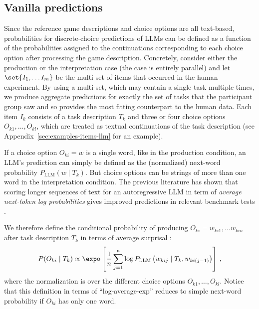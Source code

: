 \documentclass{article}
\begin{document}
\subsection{Vanilla predictions}
\label{sec:vanilla-predictions}

Since the reference game descriptions and choice options are all text-based, probabilities for discrete-choice predictions of LLMs can be defined as a function of the probabilities assigned to the continuations corresponding to each choice option after processing the game description.
Concretely, consider either the production or the interpretation case (the case is entirely parallel) and let \(\set{I_1, \dots I_m}\) be the multi-set of items that occurred in the human experiment.
By using a multi-set, which may contain a single task multiple times, we produce aggregate predictions for exactly the set of tasks that the participant group saw and so provides the most fitting counterpart to the human data.
Each item $I_{k}$ consists of a task description $T_{k}$ and three or four choice options $O_{k1}, \dots, O_{kl}$, which are treated as textual continuations of the task description (see Appendix~\ref{sec:examples-items-llm} for an example).

If a choice option $O_{ki} = w$ is a single word, like in the production condition, an LLM's prediction can simply be defined as the (normalized) next-word probability $P_{\text{LLM}} (w \mid T_{k})$.
But choice options can be strings of more than one word in the interpretation condition.
The previous literature has shown that scoring longer sequences of text for an autoregressive LLM in term of \emph{average next-token log probabilities} gives improved predictions in relevant benchmark tests \citep[e.g.,][]{BrownMann2020:Language-Models}.

We therefore define the conditional probability of producing $O_{ki} = w_{ki1}, \dots w_{kin}$ after task description $T_{k}$ in terms of average surprisal :
%
\begin{align*}
P(O_{ki} \mid T_{k}) \propto \expo \left [  \frac{1}{n} \sum_{j=1}^n \log P_{\text{LLM}} \left(w_{kij} \mid T_{k}, w_{ki(j-1)} \right) \right ] \,,
\end{align*}
%
where the normalization is over the different choice options $O_{k1}, \dots, O_{kl}$.
Notice that this definition in terms of ``log-average-exp'' reduces to simple next-word probability if $O_{ki}$ has only one word.
\end{document}
